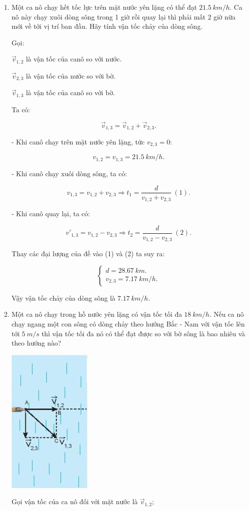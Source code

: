 \begin{enumerate}[label=\bfseries Câu \arabic*:]
{	
}
\item {}


{
	Một ca nô chạy hết tốc lực trên mặt nước yên lặng có thể đạt $\SI{21,5}{km/h}$. Ca nô này chạy xuôi dòng sông trong 1 giờ rồi quay lại thì phải mất 2 giờ nữa mới về tới vị trí ban đầu. Hãy tính vận tốc chảy của dòng sông.
}
\hideall
{
	Gọi:
	
	$\vec v_{1,2}$ là vận tốc của canô so với nước.
	
	
	$\vec v_{2,3}$ là vận tốc của nước so với bờ.
	
	
	$\vec v_{1,3}$ là vận tốc của canô so với bờ.
	
	Ta có:
	
	$$\vec v_{1,3} = \vec v_{1,2} + \vec v_{2,3}.$$
	
	- Khi canô chạy trên mặt nước yên lặng, tức $v_{2,3} = 0$:
	
	
	$$v_{1,2} = v_{1,3} = \SI{21,5}{km/h}.$$
	
	- Khi canô chạy xuôi dòng sông, ta có:
	
	$$v_{1,3} = v_{1,2} + v_{2,3} \Rightarrow t_1 = \dfrac{d}{v_{1,2} + v_{2,3}}\ (1).$$
	
	- Khi canô quay lại, ta có:
	
	$$v'_{1,3} = v_{1,2} - v_{2,3} \Rightarrow t_2 = \dfrac{d}{v_{1,2} - v_{2,3}}\ (2).$$
	
	Thay các đại lượng của đề vào (1) và (2) ta suy ra:
	
	$$\begin{cases}
		d = \SI{28,67}{km}.\\
		v_{2,3} = \SI{7,17}{km/h}.
	\end{cases}$$
	
	Vậy vận tốc chảy của dòng sông là $\SI{7,17}{km/h}$.
	
	
}
\item {}


{
	Một ca nô chạy trong hồ nước yên lặng có vận tốc tối đa $\SI{18}{km/h}$. Nếu ca nô chạy ngang một con sông có dòng chảy theo hướng Bắc - Nam với vận tốc lên tới $\SI{5}{m/s}$ thì vận tốc tối đa nó có thể đạt được so với bờ sông là bao nhiêu và theo hướng nào?
}
\hideall
{
	\begin{center}
		\includegraphics[scale=1]{../figs/VN10-2022-PH-TP005-4.jpg}
	\end{center}
	Gọi vận tốc của ca nô đối với mặt nước là $\vec v_{1,2}$; 
	
}
\end{enumerate}
